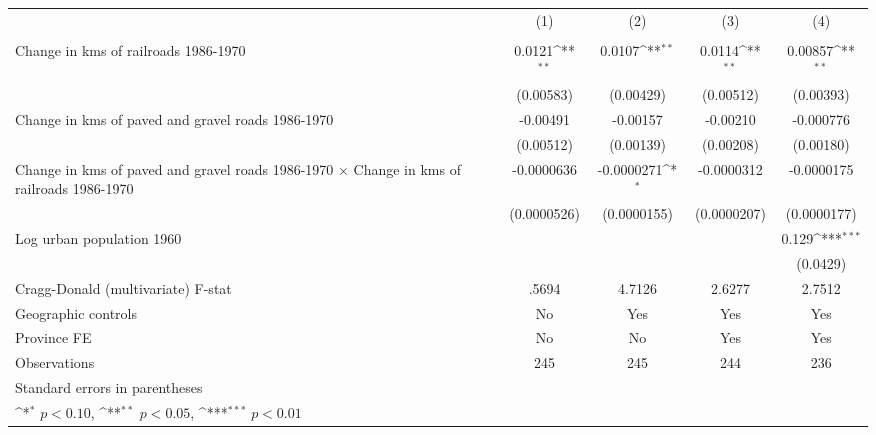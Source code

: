 {
\def\sym#1{\ifmmode^{#1}\else\(^{#1}\)\fi}
\begin{tabular}{l*{4}{c}}
\hline\hline
                &\multicolumn{1}{c}{(1)}&\multicolumn{1}{c}{(2)}&\multicolumn{1}{c}{(3)}&\multicolumn{1}{c}{(4)}\\
                &\multicolumn{1}{c}{}&\multicolumn{1}{c}{}&\multicolumn{1}{c}{}&\multicolumn{1}{c}{}\\
\hline
Change in kms of railroads 1986-1970&   0.0121\sym{**} &   0.0107\sym{**} &   0.0114\sym{**} &  0.00857\sym{**} \\
                &(0.00583)         &(0.00429)         &(0.00512)         &(0.00393)         \\
[1em]
Change in kms of paved and gravel roads 1986-1970& -0.00491         & -0.00157         & -0.00210         &-0.000776         \\
                &(0.00512)         &(0.00139)         &(0.00208)         &(0.00180)         \\
[1em]
Change in kms of paved and gravel roads 1986-1970 $\times$ Change in kms of railroads 1986-1970&-0.0000636         &-0.0000271\sym{*}  &-0.0000312         &-0.0000175         \\
                &(0.0000526)         &(0.0000155)         &(0.0000207)         &(0.0000177)         \\
[1em]
Log urban population 1960&                  &                  &                  &    0.129\sym{***}\\
                &                  &                  &                  & (0.0429)         \\
\hline
Cragg-Donald (multivariate) F-stat&    .5694         &   4.7126         &   2.6277         &   2.7512         \\
Geographic controls&       No         &      Yes         &      Yes         &      Yes         \\
Province FE     &       No         &       No         &      Yes         &      Yes         \\
Observations    &      245         &      245         &      244         &      236         \\
\hline\hline
\multicolumn{5}{l}{\footnotesize Standard errors in parentheses}\\
\multicolumn{5}{l}{\footnotesize \sym{*} \(p<0.10\), \sym{**} \(p<0.05\), \sym{***} \(p<0.01\)}\\
\end{tabular}
}

